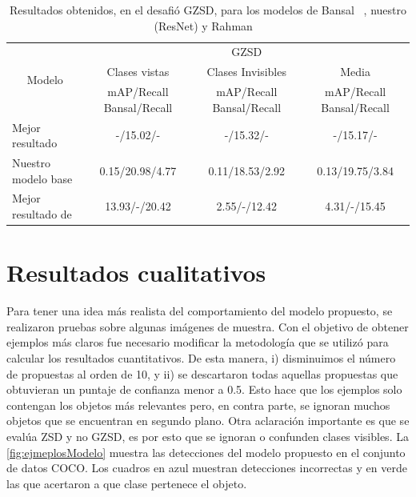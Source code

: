 \begin{table}[]
	\centering
	\resizebox{\textwidth}{!} {
		\begin{tabular}{|l|c|c|c|}
			\hline
			\multicolumn{1}{|c|}{\multirow{3}{*}{Modelo}} & \multicolumn{3}{c|}{GZSD}                                                       \\ \cline{2-4} 
			\multicolumn{1}{|c|}{}                        & Clases vistas             & Clases Invisibles        & Media                    \\ \cline{2-4} 
			\multicolumn{1}{|c|}{}                        & mAP/Recall Bansal/Recall  & mAP/Recall Bansal/Recall & mAP/Recall Bansal/Recall \\ \hline
			Mejor resultado \cite{bansal2018zero}                                        & -/15.02/-                 & -/15.32/-                & -/15.17/-                \\ \hline
			Nuestro modelo base                              & 0.15/20.98/4.77           & 0.11/18.53/2.92          & 0.13/19.75/3.84           \\ \hline
			Mejor resultado de \cite{rahman2020zero}     & 13.93/-/20.42             & 2.55/-/12.42             & 4.31/-/15.45             \\ \hline
		\end{tabular}
	}
	\caption{Resultados obtenidos, en el desafió GZSD, para los modelos de Bansal \etal~\cite{bansal2018zero}, nuestro (ResNet) y Rahman \etal~\cite{rahman2020zero}}
	\label{tab:resultados-gzsd}
\end{table}
\newpage

\section{Resultados cualitativos} \label{sec:resultadoscualitativos}

Para tener una idea más realista del comportamiento del modelo propuesto, se realizaron pruebas sobre algunas imágenes de muestra. Con el objetivo de obtener ejemplos más claros fue necesario modificar la metodología que se utilizó para calcular los resultados cuantitativos. De esta manera, i) disminuimos el número de propuestas al orden de 10, y ii) se descartaron todas aquellas propuestas que obtuvieran un puntaje de confianza menor a 0.5. Esto hace que los ejemplos solo contengan los objetos más relevantes pero, en contra parte, se ignoran muchos objetos que se encuentran en segundo plano. Otra aclaración importante es que se evalúa ZSD y no GZSD, es por esto que se ignoran o confunden clases visibles. La \autoref{fig:ejmeplosModelo} muestra las detecciones del modelo propuesto en el conjunto de datos COCO. Los cuadros en azul muestran detecciones incorrectas y en verde las que acertaron a que clase pertenece el objeto.\\

